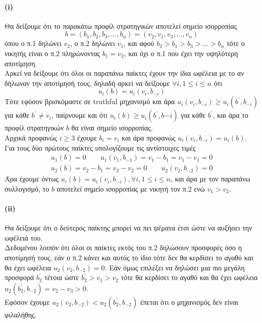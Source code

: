 \documentclass[a4paper,11pt]{article}
\begin{document}
\paragraph{(i)} Θα δείξουμε ότι το παρακάτω προφίλ στρατηγικών αποτελεί σημείο ισορροπίας
\[b = (b_1,b_2,b_3,\dots,b_n) = (v_2,v_1,v_3,\dots,v_n)\]
όπου ο π.1 δηλώνει $v_2$, ο π.2 δηλώνει $v_1$, και αφού $b_2 > b_1 > b_3 > \dots > b_n$ τότε ο νικητής είναι ο π.2 πληρώνοντας $b_1 = v_2$, και όχι ο π.1 που έχει την υψηλότερη αποτίμηση.
\\[8pt]
Αρκεί να δείξουμε ότι όλοι οι παραπάνω παίκτες έχουν την ίδια ωφέλεια με το αν δήλωναν την αποτίμησή τους, δηλαδή αρκεί να δείξουμε $\forall i, 1 \leq i \leq n$ ότι
\[u_i(b) = u_i(v_i,b_{-i})\]
Τότε εφόσον βρισκόμαστε σε truthful μηχανισμό και άρα $u_i(v_i,b_{-i}) \geq u_i(b^\prime,b_{-i})$ για κάθε $b^\prime \neq v_i$, παίρνουμε και ότι $u_i(b) \geq u_i(b^\prime,b{-i})$ για κάθε $b^\prime$, και άρα το προφίλ στρατηγικών $b$ θα είναι σημείο ισορροπίας.
\\[8pt]
Αρχικά προφανώς $i \geq 3$ έχουμε $b_i=v_i$ και άρα προφανώς $u_i(v_i,b_{-i}) = u_i(b)$.
Για τους δύο πρώτους παίκτες υπολογίζουμε τις αντίστοιχες τιμές
\begin{align*}
  u_1(b) = 0 \qquad u_1(v_1,b_{-1}) = v_1 - b_1 = v_1 - v_1 = 0\\[3pt]
  u_2(b) = v_2 - b_1 = v_2 - v_2 = 0 \qquad u_2(v_2,b_{-2}) = 0
\end{align*}
Άρα έχουμε όντως $u_i(b) = u_i(v_i,b_{-i}), \forall i, 1 \leq i \leq n$, και άρα με τον παραπάνω συλλογισμό, το $b$ αποτελεί σημείο ισορροπίας με νικητή τον π.2 ενώ $v_1>v_2$.

\paragraph{(ii)} Θα δείξουμε ότι ο δεύτερος παίκτης μπορεί να πει ψέματα έτσι ώστε να αυξήσει την ωφέλειά του.
\\[8pt]
Δεδομένου λοιπόν ότι όλοι οι παίκτες εκτός του π.2 δηλώσουν προσφορές όσο η αποτίμησή τους, εάν ο π.2 κάνει και αυτός το ίδιο τότε δεν θα κερδίσει το αγαθό και θα έχει ωφέλεια $u_2(v_2,b_{-2}) = 0$.
Εάν όμως επιλέξει να δηλώσει μια πιο μεγάλη προσφορά $b_2^\prime$ τέτοια ώστε $b_2^\prime > v_1 > v_2$ τότε θα κερδίσει το αγαθό και θα έχει ωφέλεια $u_2(b_2^\prime,b_{-2}) = v_2-v_3 > 0$.
\\[8pt]
Εφόσον έχουμε $u_2(v_2,b_{-2}) < u_2(b_2^\prime,b_{-2})$ έπεται ότι ο μηχανισμός δεν είναι φιλαλήθης.
\end{document}

